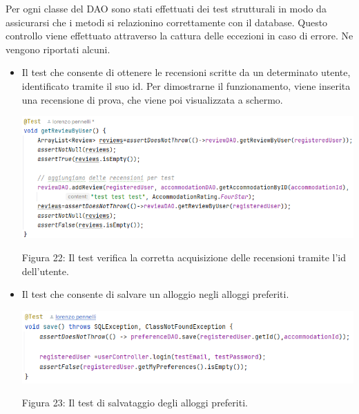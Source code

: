 \documentclass[10pt]{article}
\begin{document}
Per ogni classe del DAO sono stati effettuati dei test strutturali in modo da assicurarsi che i metodi si relazionino correttamente con il database. Questo controllo viene effettuato attraverso la cattura delle eccezioni in caso di errore. Ne vengono riportati alcuni.
\begin{itemize}

\item Il test che consente di ottenere le recensioni scritte da un determinato utente, identificato tramite il suo id. Per dimostrarne il funzionamento, viene inserita una recensione di prova, che viene poi visualizzata a schermo.
\par\medskip
\hspace{-1cm}
\includegraphics[scale=0.65]{test/orm/getReviewByUser}
\begin{center}
\par\medskip
Figura 22: Il test verifica la corretta acquisizione delle recensioni tramite l'id dell'utente.
\par\medskip
\end{center}

\item Il test che consente di salvare un alloggio negli alloggi preferiti.
\par\medskip
\hspace{-1cm}
\includegraphics[scale=0.75]{test/orm/save}
\begin{center}
\par\medskip
Figura 23: Il test di salvataggio degli alloggi preferiti.
\par\medskip
\end{center}

\end{itemize}
\end{document}
